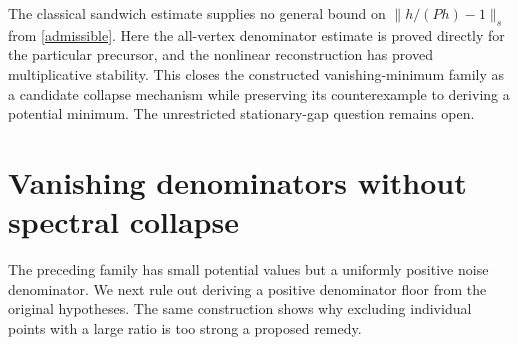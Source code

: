 \documentclass[11pt]{article}
\begin{document}
The classical sandwich estimate supplies no general bound on
$\|h/(Ph)-1\|_s$ from \eqref{admissible}. Here the all-vertex
denominator estimate is proved directly for the particular precursor,
and the nonlinear reconstruction has proved multiplicative stability.
This closes the constructed vanishing-minimum family as a candidate
collapse mechanism while preserving its counterexample to deriving a
potential minimum. The unrestricted stationary-gap question remains open.


\section{Vanishing denominators without spectral collapse}\label{vanishingdenominator}
The preceding family has small potential values but a uniformly positive
noise denominator. We next rule out deriving a positive denominator floor
from the original hypotheses. The same construction shows why excluding
individual points with a large ratio is too strong a proposed remedy.
\end{document}
